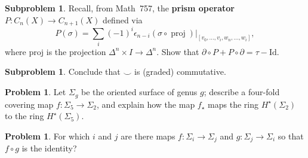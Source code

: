 \documentclass[12pt]{handout}
\theoremstyle{definition}
\newtheorem{problem}[theorem]{Problem}
\newtheorem{subproblem}[theorem]{Subproblem}
\DeclareMathOperator{\projection}{proj}
\begin{document}
\begin{subproblem}
 Recall, from Math~757, the \textbf{prism
    operator} $P : C_n(X) \to C_{n+1}(X)$ defined via
  \[
  P(\sigma) = \sum_i (-1)^i \epsilon_{n-i} (\sigma \circ \projection)
  |_{[v_0,\ldots,v_i,w_n,\ldots, w_i]},
  \]
  where $\mathrm{proj}$ is the projection $\Delta^n \times I \to \Delta^n$.
  Show that $\partial \circ P + P \circ \partial = \tau - \mathrm{Id}$.
\end{subproblem}

\begin{subproblem}
  Conclude that $\smallsmile$ is (graded) commutative.
\end{subproblem}

\begin{problem}
  Let $\Sigma_g$ be the oriented surface of genus $g$; describe a
  four-fold covering map $f : \Sigma_5 \to \Sigma_2$, and explain how
  the map $f_\star$ maps the ring $H^\star(\Sigma_2)$ to the ring
  $H^\star(\Sigma_5)$.
\end{problem}

\begin{problem}
  For which $i$ and $j$ are there maps $f : \Sigma_i \to \Sigma_j$ and
  $g : \Sigma_j \to \Sigma_i$ so that $f \circ g$ is the identity?
\end{problem}

\pagebreak
\null
\end{document}
